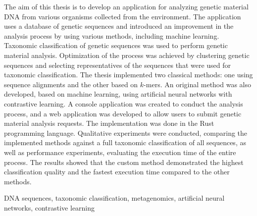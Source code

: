 \cleardoublepage{}

\secondabstract{}
The aim of this thesis is to develop an application for analyzing genetic material DNA from various organisms collected from the environment. The application uses a database of genetic sequences and introduced an improvement in the analysis process by using various methods, including machine learning.
Taxonomic classification of genetic sequences was used to perform genetic material analysis. Optimization of the process was achieved by clustering genetic sequences and selecting representatives of the sequences that were used for taxonomic classification. The thesis implemented two classical methods: one using sequence alignments and the other based on $k$-mers. An original method was also developed, based on machine learning, using artificial neural networks with contrastive learning. A console application was created to conduct the analysis process, and a web application was developed to allow users to submit genetic material analysis requests. The implementation was done in the Rust programming language.
Qualitative experiments were conducted, comparing the implemented methods against a full taxonomic classification of all sequences, as well as performance experiments, evaluating the execution time of the entire process. The results showed that the custom method demonstrated the highest classification quality and the fastest execution time compared to the other methods.

\secondkeywords{}
DNA sequences, taxonomic classification,  metagenomics, artificial neural networks, contrastive learning
